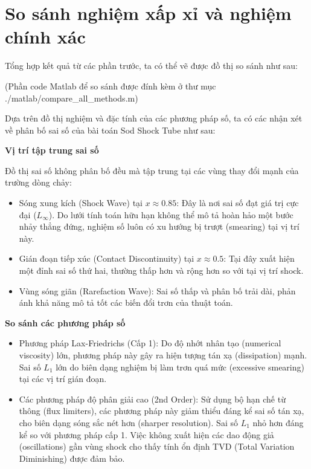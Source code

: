 
\section{So sánh nghiệm xấp xỉ và nghiệm chính xác}

Tổng hợp kết quả từ các phần trước, ta có thể vẽ được đồ thị so sánh như sau:



(Phần code Matlab để so sánh được đính kèm ở thư mục ./matlab/compare\_all\_methods.m)

Dựa trên đồ thị nghiệm và đặc tính của các phương pháp số, ta có các nhận xét về phân bố sai số của bài toán Sod Shock Tube như sau:

\textbf{Vị trí tập trung sai số}

Đồ thị sai số không phân bố đều mà tập trung tại các vùng thay đổi mạnh của trường dòng chảy:
\begin{itemize}
    \item Sóng xung kích (Shock Wave) tại $x \approx 0.85$: Đây là nơi sai số đạt giá trị cực đại ($L_\infty$). Do lưới tính toán hữu hạn không thể mô tả hoàn hảo một bước nhảy thẳng đứng, nghiệm số luôn có xu hướng bị trượt (smearing) tại vị trí này.
    \item Gián đoạn tiếp xúc (Contact Discontinuity) tại $x \approx 0.5$: Tại đây xuất hiện một đỉnh sai số thứ hai, thường thấp hơn và rộng hơn so với tại vị trí shock.
    \item Vùng sóng giãn (Rarefaction Wave): Sai số thấp và phân bố trải dài, phản ánh khả năng mô tả tốt các biến đổi trơn của thuật toán.
\end{itemize}

\textbf{So sánh các phương pháp số}
\begin{itemize}
    \item Phương pháp Lax-Friedrichs (Cấp 1):
    Do độ nhớt nhân tạo (numerical viscosity) lớn, phương pháp này gây ra hiện tượng tán xạ (dissipation) mạnh. Sai số $L_1$ lớn do biên dạng nghiệm bị làm trơn quá mức (excessive smearing) tại các vị trí gián đoạn.
    
    \item Các phương pháp độ phân giải cao (2nd Order):
    Sử dụng bộ hạn chế từ thông (flux limiters), các phương pháp này giảm thiểu đáng kể sai số tán xạ, cho biên dạng sóng sắc nét hơn (sharper resolution). Sai số $L_1$ nhỏ hơn đáng kể so với phương pháp cấp 1. Việc không xuất hiện các dao động giả (oscillations) gần vùng shock cho thấy tính ổn định TVD (Total Variation Diminishing) được đảm bảo.
\end{itemize}
